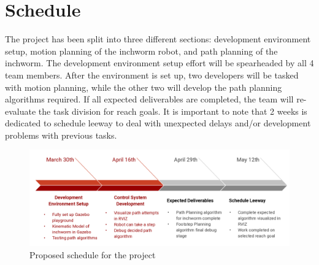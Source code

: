 \section{Schedule}
The project has been split into three different sections: development environment setup, motion planning of the inchworm robot, and path planning of the inchworm. The development environment setup effort will be spearheaded by all 4 team members. After the environment is set up, two developers will be tasked with motion planning, while the other two will develop the path planning algorithms required. If all expected deliverables are completed, the team will re-evaluate the task division for reach goals. It is important to note that 2 weeks is dedicated to schedule leeway to deal with unexpected delays and/or development problems with previous tasks.

\begin{figure}[ht]
    \includegraphics[width=\linewidth]{figures/Schedule.png}
    \caption{Proposed schedule for the project}
    \label{fig:Schedule}
\end{figure} 